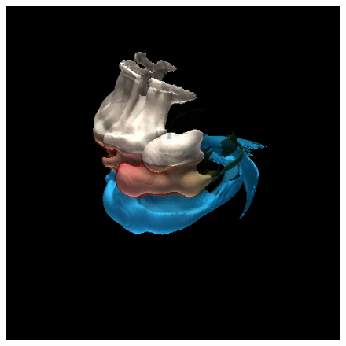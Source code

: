 \documentclass{egpubl}
\newlength{\boxheight}
\begin{document}
\begin{figure}[p]
  \centering
  \savebox{}
  \settoheight{\boxheight}{\usebox\savedProteinBox}
  \begin{minipage}[b][\boxheight][b]{0.24\linewidth}
    \centering%
    \begin{minipage}[t]{0.98\linewidth}
      \centering
      \includegraphics[width=\textwidth]{snapshots/space/space-only-isos.jpg}

\end{minipage}
\end{minipage}
\end{figure}
\end{document}

